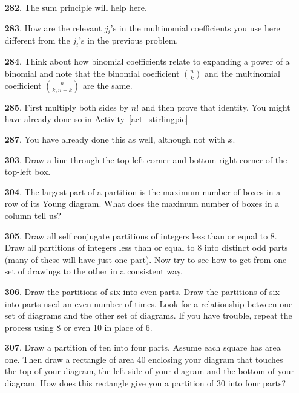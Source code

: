 \documentclass[10pt,]{book}
\theoremstyle{plain}
\theoremstyle{definition}
\theoremstyle{definition}
\theoremstyle{definition}
\numberwithin{equation}{chapter}
\begin{document}
\begin{itemize}[itemsep=1em]
\item[\textbf{282}.]\hypertarget{p-1432}{}%
The sum principle will help here.%

\item[\textbf{283}.]\hypertarget{p-1435}{}%
How are the relevant \(j_i\)'s in the multinomial coefficients you use here different from the \(j_i\)'s in the previous problem.%

\item[\textbf{284}.]\hypertarget{p-1438}{}%
Think about how binomial coefficients relate to expanding a power of a binomial and note that the binomial coefficient \(\binom{n}{k}\) and the multinomial coefficient \(\binom{n}{k,n-k}\) are the same.%

\item[\textbf{285}.]\hypertarget{p-1443}{}%
First multiply both sides by \(n!\) and then prove that identity.  You might have already done so in \hyperref[act_stirlingpie]{Activity~\ref{act_stirlingpie}}%

\item[\textbf{287}.]\hypertarget{p-1451}{}%
You have already done this as well, although not with \(x\).%

\item[\textbf{303}.]\hypertarget{p-1500}{}%
Draw a line through the top-left corner and bottom-right corner of the top-left box.%

\item[\textbf{304}.]\hypertarget{p-1504}{}%
The largest part of a partition is the maximum number of boxes in a row of its Young diagram. What does the maximum number of boxes in a column tell us?%

\item[\textbf{305}.]\hypertarget{p-1507}{}%
Draw all self conjugate partitions of integers less than or equal to 8.  Draw all partitions of integers less than or equal to 8 into distinct odd parts (many of these will have just one part). Now try to see how to get from one set of drawings to the other in a consistent way.%

\item[\textbf{306}.]\hypertarget{p-1511}{}%
Draw the partitions of six into even parts. Draw the partitions of six into parts used an even number of times. Look for a relationship between one set of diagrams and the other set of diagrams. If you have trouble, repeat the process using 8 or even 10 in place of 6.%

\item[\textbf{307}.]\hypertarget{p-1514}{}%
Draw a partition of ten into four parts. Assume each square has area one. Then draw a rectangle of area 40 enclosing your diagram that touches the top of your diagram, the left side of your diagram and the bottom of your diagram. How does this rectangle give you a partition of 30 into four parts?%


\end{itemize}
\end{document}
